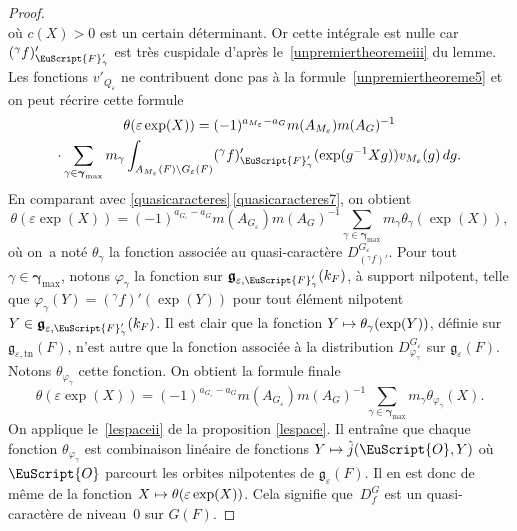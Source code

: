 \documentclass[JEP,XML,SOM,Unicode,francais]{cedram}
\let\mathcal \EuScript
\let\epsilon\varepsilon
\newcommand\mto{\mathchoice{\longmapsto}{\mapsto}{\mapsto}{\mapsto}}
\newcommand{\frg}{\mathfrak{g}}
\newcommand{\tn}{\mathrm{tn}}
\newcommand{\cF}{\mathcal{F}}
\newcommand{\cO}{\mathcal{O}}
\theoremstyle{plain}
\theoremstyle{definition}
\begin{document}
\begin{proof}
\[\]
où $c(X)>0$ est un certain déterminant. Or cette intégrale est nulle car $(^{\gamma}f)'_{\cF'_{\gamma}}$ est très cuspidale d'après le~\eqref{unpremiertheoremeiii} du lemme. Les fonctions $v'_{Q_{\epsilon}}$ ne contribuent donc pas à la formule~\eqref{unpremiertheoreme5} et on peut récrire cette formule
\begin{multline*}
\theta(\epsilon \exp(X))=(-1)^{a_{M_{\epsilon}}-a_{G}}m(A_{M_{\epsilon}})m(A_{G})^{-1}\\
\cdot\sum_{\gamma\in \boldsymbol{\gamma}_{\max}}m_{\gamma}
\int_{A_{M_{\epsilon}}(F)\backslash G_{\epsilon}(F)}(^{\gamma}f)'_{\cF'_{\gamma}}(\exp(g^{-1}X g))v_{M_{\epsilon}} (g)\,dg.
\end{multline*}
En comparant avec \ref{quasicaracteres}\,\eqref{quasicaracteres7}, on obtient
\[
\theta(\epsilon \exp(X))=(-1)^{a_{G_{\epsilon}}-a_{G}}m(A_{G_{\epsilon}})m(A_{G})^{-1}\sum_{\gamma\in \boldsymbol{\gamma}_{\max}}m_{\gamma}\theta_{\gamma}(\exp(X)),
\]
où on~a noté $\theta_{\gamma}$ la fonction associée au quasi-caractère $D^{G_{\epsilon}}_{(^{\gamma}f)'}$. Pour tout $\gamma\in \boldsymbol{\gamma}_{\max}$, notons $\varphi_{\gamma}$ la fonction sur $\boldsymbol{\frg}_{\epsilon,\cF'_{\gamma}}(k_{F})$, à support nilpotent, telle que $\varphi_{\gamma}(Y)=(^{\gamma}f)'(\exp(Y))$ pour tout élément nilpotent $Y\in \boldsymbol{\frg}_{\epsilon,\cF'_{\gamma}}(k_{F})$. Il est clair que la fonction $Y\mto \theta_{\gamma}(\exp(Y))$, définie sur $\frg_{\epsilon,\tn}(F)$, n'est autre que la fonction associée à la distribution $D^{G_{\epsilon}}_{\varphi_{\gamma}}$ sur $\frg_{\epsilon}(F)$. Notons $\theta_{\varphi_{\gamma}}$ cette fonction. On obtient la formule finale
\begin{equation}\tag{6}\label{unpremiertheoreme6}
\theta(\epsilon \exp(X))=(-1)^{a_{G_{\epsilon}}-a_{G}}m(A_{G_{\epsilon}})m(A_{G})^{-1}\sum_{\gamma\in \boldsymbol{\gamma}_{\max}}m_{\gamma}\theta_{\varphi_{\gamma}}(X).
\end{equation}
On applique le~\eqref{lespaceii} de la proposition \ref{lespace}. Il entraîne que chaque fonction $\theta_{\varphi_{\gamma}}$ est combinaison linéaire de fonctions $Y\mto \hat{j}(\cO,Y)$ où $\cO$ parcourt les orbites nilpotentes de $\frg_{\epsilon}(F)$. Il en est donc de même
de la fonction $X\mto \theta(\epsilon \exp(X))$. Cela signifie que~$D^G_{f}$ est un quasi-caractère de niveau~$0$ sur $G(F)$.
\end{proof}

\label{restriction}
\end{document}
